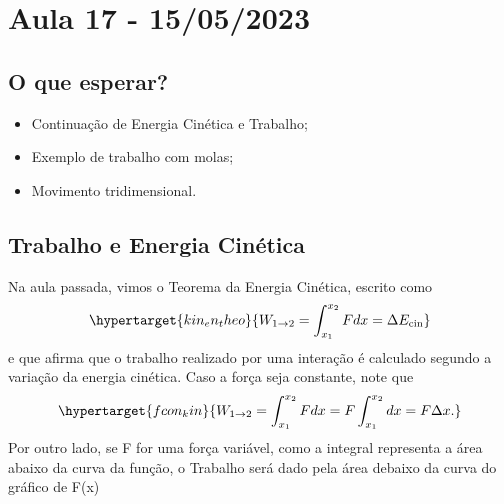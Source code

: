 \documentclass[PhysicsI/physics_notes.tex]{subfiles}
\begin{document}
\section{Aula 17 - 15/05/2023}
\subsection{O que esperar?}
\begin{itemize}
	\item Continuação de Energia Cinética e Trabalho;
	\item Exemplo de trabalho com molas;
	\item Movimento tridimensional.
\end{itemize}
\subsection{Trabalho e Energia Cinética}
Na aula passada, vimos o Teorema da Energia Cinética, escrito como
\[
	\hypertarget{kin_en_theo}{W_{1\rightarrow 2} = \int_{x_1}^{x_2}Fdx = \Delta E_{\text{cin}}}
\]
e que afirma que o trabalho realizado por uma interação é calculado segundo a variação
da energia cinética. Caso a força seja constante, note que
\[
	\hypertarget{fcon_kin}{W_{1\rightarrow 2} = \int_{x_1}^{x_2} Fdx = F\int_{x_1}^{x_2}dx = F\Delta x.}
\]
Por outro lado, se F for uma força variável, como a integral representa a área
abaixo da curva da função, o Trabalho será dado pela área debaixo da curva do
gráfico de F(x)

\end{document}
